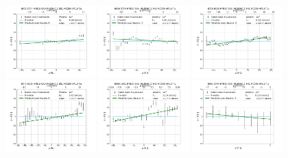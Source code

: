 \begin{figure}
    \centering
    \includegraphics[width=0.31\textwidth]{Images/WLSFITS/CC1/8601-3704.png}
    \includegraphics[width=0.31\textwidth]{Images/WLSFITS/CC1/8616-3704.png}
    \includegraphics[width=0.31\textwidth]{Images/WLSFITS/CC1/8715-6103.png}
    \includegraphics[width=0.31\textwidth]{Images/WLSFITS/CC1/8940-6101.png}
    \includegraphics[width=0.31\textwidth]{Images/WLSFITS/CC1/8990-1901.png}
    \includegraphics[width=0.31\textwidth]{Images/WLSFITS/CC1/8991-3704.png}

\end{figure}
